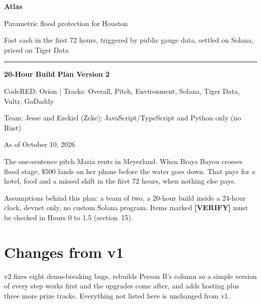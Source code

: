 \documentclass[11pt]{article}
\newcommand{\verify}{\textbf{[VERIFY]}}
\begin{document}
\begin{titlepage}
\thispagestyle{empty}
\vspace*{3.2cm}
{\fontsize{46}{50}\selectfont\bfseries\color{atlasblue} Atlas\par}
\vspace{0.4cm}
{\LARGE Parametric flood protection for Houston\par}
\vspace{0.5cm}
{\large Fast cash in the first 72 hours, triggered by public gauge data, settled on Solana, priced on Tiger Data\par}
\vspace{0.8cm}
{\color{atlasblue}\rule{\linewidth}{0.8pt}}
\vspace{0.8cm}

{\large\bfseries 20-Hour Build Plan \textemdash{} Version 2\par}
\vspace{0.3cm}
CodeRED: Orion \quad | \quad Tracks: Overall, Pitch, Environment, Solana, Tiger Data, Vultr, GoDaddy\par
Team: Jesse and Ezekiel (Zeke); JavaScript/TypeScript and Python only (no Rust)\par
As of October 10, 2026\par
\vspace{1cm}

\begin{callout}{The one-sentence pitch}
Maria rents in Meyerland. When Brays Bayou crosses flood stage, \$500 lands on her phone before the water goes down. That pays for a hotel, food and a missed shift in the first 72 hours, when nothing else pays.
\end{callout}

\vfill
{\small Assumptions behind this plan: a team of two, a 20-hour build inside a 24-hour clock, devnet only, no custom Solana program. Items marked \verify{} must be checked in Hours 0 to 1.5 (section~15).\par}
\end{titlepage}

\tableofcontents
\newpage

\section*{Changes from v1}

v2 fixes eight demo-breaking bugs, rebuilds Person B's column so a simple version of every step works first and the upgrades come after, and adds hosting plus three more prize tracks. Everything not listed here is unchanged from v1.
\end{document}
